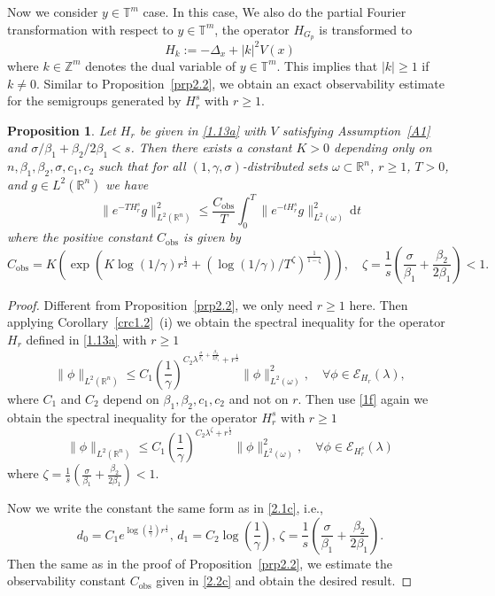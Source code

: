 \documentclass{article}
\numberwithin{equation}{section}
\renewcommand{\d}{\,\mathrm{d}}
\newcommand\R{\ensuremath{\mathbb{R}}}
\newcommand\Z{\ensuremath{\mathbb{Z}}}
\newcommand\T{\ensuremath{\mathbb{T}}}
\newtheorem{proposition}[theorem]{Proposition}
\numberwithin{equation}{section}
\theoremstyle{definition}
\begin{document}
Now we consider $y\in \T^{m}$ case. In this case, We also do the partial Fourier transformation with respect to $y\in \T^{m}$, the operator $H_{G_p}$ is transformed to
\[
	H_{k}:=-\Delta_x+|k|^2V(x)
\] 
where $k\in \Z^{m}$ denotes the dual variable of $y\in \T^{m}$. This implies that $|k|\ge 1$ if  $k\neq 0$. 
Similar to Proposition~\ref{prp2.2}, we obtain an exact observability estimate for the semigroups generated by $H_r^{s}$ with  $r\ge 1$.
\begin{proposition}\label{prp2.4e}
	Let $H_r$ be given in \eqref{1.13a} with $V$ satisfying Assumption~\ref{A1} and $\sigma /\beta_1 +\beta_2 /2\beta_1<s$. Then there exists a constant $K>0$ depending only on $n,\beta_1,\beta_2,\sigma ,c_1,c_2$ such that for all $(1,\gamma,\sigma)$-distributed sets $\omega\subset \R^{n}$, $r\ge 1$, $T>0$, and $g\in L^2(\R^{n})$ we have
	\begin{equation}
		\|e^{-TH_r^{s}}g\|_{L^2(\R^{n})}^2\le \frac{C_{\mathrm{obs}}}{T}\int_0^{T}\|e^{-tH_r^{s}}g\|^2_{L^2(\omega)}\d t
	\end{equation}
	where the positive constant $C_{\mathrm{obs}}$ is given by
	\begin{equation}
	C_{\mathrm{obs}}= K\left( \exp\left( K\log(1 /\gamma) r^{ \frac{1}{2}}+\left( \log(1 /\gamma) /T^{\zeta} \right)^{\frac{1}{1-\zeta}}  \right)  \right),\quad  \zeta= \frac{1}{s}\left(\frac{\sigma }{\beta_1}+\frac{\beta_2}{2\beta_1}\right)<1. 
	\end{equation}
\end{proposition}
\begin{proof}
	Different from Proposition~\ref{prp2.2}, we only need $r\ge 1$ here. Then applying Corollary~\ref{crc1.2}~(i) we obtain the spectral inequality for the operator $H_r$ defined in \eqref{1.13a} with $r\ge 1$
	 \begin{equation}
		\|\phi\|_{L^2(\R^{n})}\le C_1 \left( \frac{1}{\gamma} \right) ^{C_2 \lambda ^{\frac{\sigma }{\beta_1}+\frac{\beta_2}{2\beta_1}}+r^{\frac{1}{2}}} \|\phi\|^2_{L^2(\omega)}, \quad \forall \phi \in \mathcal{E}_{H_r}(\lambda),
	\end{equation}
	where $C_1$ and $C_2$ depend on $\beta_1,\beta_2,c_1,c_2$ and not on $r$. Then use \eqref{1f} again we obtain the spectral inequality for the operator $H^{s}_r$ with $r\ge 1$
	\[
	\|\phi\|_{L^2(\R^{n})}\le C_1 \left( \frac{1}{\gamma} \right) ^{C_2\lambda^{\zeta}+r^{\frac{1}{2}}} \|\phi\|^2_{L^2(\omega)},\quad  \forall\phi \in \mathcal{E}_{H_r^{s}}(\lambda)
	\]
	where $\zeta =\frac{1}{s}\left( \frac{\sigma }{\beta_1}+\frac{\beta_2}{2\beta_1} \right) <1$.

	Now we write the constant the same form as in \eqref{2.1c}, i.e.,
	\begin{equation}
		d_0=C_1e^{\log\left( \frac{1}{\gamma} \right) r^{\frac{1}{2}}},\,d_1=C_2\log\left( \frac{1}{\gamma} \right),\,\zeta =\frac{1}{s}\left( \frac{\sigma }{\beta_1}+\frac{\beta_2}{2\beta_1}\right). 
	\end{equation}
	Then the same as in the proof of Proposition~\ref{prp2.2}, we estimate the observability constant $C_{\mathrm{obs}}$ given in \eqref{2.2c} and obtain the desired result.
\end{proof}
\end{document}
